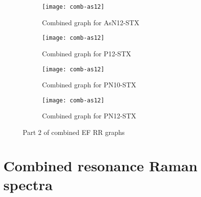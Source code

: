 \newpage

\begin{figure*}[h]
\centering
\begin{subfigure}{8.25cm}\centering\texttt{[image: comb-as12]}\caption{Combined graph for AsN12-STX}\end{subfigure}%
\begin{subfigure}{8.25cm}\centering\texttt{[image: comb-as12]}\caption{Combined graph for P12-STX}\end{subfigure}
\begin{subfigure}{8.25cm}\centering\texttt{[image: comb-as12]}\caption{Combined graph for PN10-STX}\end{subfigure}%
\begin{subfigure}{8.25cm}\centering\texttt{[image: comb-as12]}\caption{Combined graph for PN12-STX}\end{subfigure}
\caption[Part 2 of combined EF RR graphs]{Part 2 of combined EF RR graphs}
\end{figure*}


\newpage
\section{Combined resonance Raman spectra}
